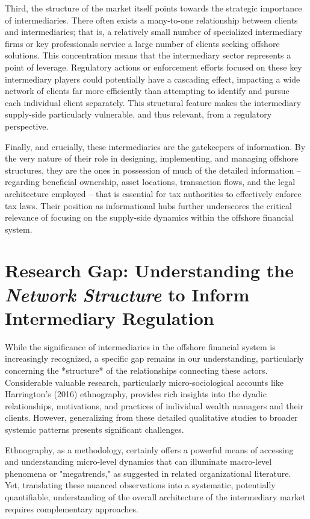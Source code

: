 Third, the structure of the market itself points towards the strategic importance of intermediaries. There often exists a many-to-one relationship between clients and intermediaries; that is, a relatively small number of specialized intermediary firms or key professionals service a large number of clients seeking offshore solutions. This concentration means that the intermediary sector represents a point of leverage. Regulatory actions or enforcement efforts focused on these key intermediary players could potentially have a cascading effect, impacting a wide network of clients far more efficiently than attempting to identify and pursue each individual client separately. This structural feature makes the intermediary supply-side particularly vulnerable, and thus relevant, from a regulatory perspective.

Finally, and crucially, these intermediaries are the gatekeepers of information. By the very nature of their role in designing, implementing, and managing offshore structures, they are the ones in possession of much of the detailed information – regarding beneficial ownership, asset locations, transaction flows, and the legal architecture employed – that is essential for tax authorities to effectively enforce tax laws. Their position as informational hubs further underscores the critical relevance of focusing on the supply-side dynamics within the offshore financial system.

\section{Research Gap: Understanding the \textit{Network Structure} to Inform Intermediary Regulation}
\label{sec:1_4}

While the significance of intermediaries in the offshore financial system is increasingly recognized, a specific gap remains in our understanding, particularly concerning the *structure* of the relationships connecting these actors. Considerable valuable research, particularly micro-sociological accounts like Harrington's (2016) ethnography, provides rich insights into the dyadic relationships, motivations, and practices of individual wealth managers and their clients. However, generalizing from these detailed qualitative studies to broader systemic patterns presents significant challenges.

Ethnography, as a methodology, certainly offers a powerful means of accessing and understanding micro-level dynamics that can illuminate macro-level phenomena or "megatrends," as suggested in related organizational literature. Yet, translating these nuanced observations into a systematic, potentially quantifiable, understanding of the overall architecture of the intermediary market requires complementary approaches.

